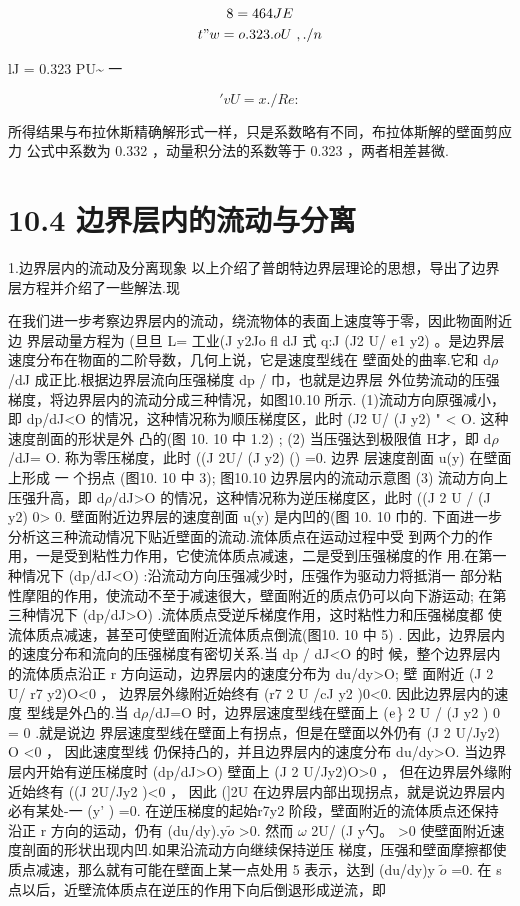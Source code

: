 \begin{gather*}
8=464JE\\
t"w = o. 323.oU ~,  ./n
\end{gather*}

lJ = 0.323 PU\textasciitilde{} 一

\['v U = x ./Re:\]

所得结果与布拉休斯精确解形式一样，只是系数略有不同，布拉体斯解的壁面剪应力 公式中系数为 0.332 ，动量积分法的系数等于 0.323 ，两者相差甚微.

\section*{10.4  边界层内的流动与分离}

1.边界层内的流动及分离现象 以上介绍了普朗特边界层理论的思想，导出了边界层方程并介绍了一些解法.现

在我们进一步考察边界层内的流动，绕流物体的表面上速度等于零，因此物面附近边 界层动量方程为 (旦旦 L= 工业(J y2Jo fl dJ 式 q:J (J2 U/ ${\rm e}$1 y2) 。是边界层速度分布在物面的二阶导数，几何上说，它是速度型线在 壁面处的曲率.它和 d$\rho$/dJ 成正比.根据边界层流向压强梯度 dp / 巾，也就是边界层 外位势流动的压强梯度，将边界层内的流动分成三种情况，如图10.10 所示. (1)流动方向原强减小，即 dp/dJ<O 的情况，这种情况称为顺压梯度区，此时 (J2 U/ (J y2) " < O. 这种速度剖面的形状是外 凸的(图 10. 10 中 1.2) ; (2) 当压强达到极限值 H才，即 d$\rho$/dJ= O. 称为零压梯度，此时 ((J 2U/ (J y2) () =0. 边界 层速度剖面 u(y) 在壁面上形成 一 个拐点 (图10. 10 中 3); 图10.10 边界层内的流动示意图 (3) 流动方向上压强升高，即 d$\rho$/dJ>O 的情况，这种情况称为逆压梯度区，此时 ((J 2 U / (J y2) 0> 0. 壁面附近边界层的速度剖面 u(y) 是内凹的(图 10. 10 巾的. 下面进一步分析这三种流动情况下贴近壁面的流动.流体质点在运动过程中受 到两个力的作用，一是受到粘性力作用，它使流体质点减速，二是受到压强梯度的作 用.在第一种情况下 (dp/dJ<O) :沿流动方向压强减少时，压强作为驱动力将抵消一 部分粘性摩阻的作用，使流动不至于减速很大，壁面附近的质点仍可以向下游运动; 在第三种情况下 (dp/dJ>O) .流体质点受逆斥梯度作用，这时粘性力和压强梯度都 使流体质点减速，甚至可使壁面附近流体质点倒流(图10. 10 中 5) . 因此，边界层内的速度分布和流向的压强梯度有密切关系.当 dp / dJ<O 的时 候，整个边界层内的流体质点沿正 r 方向运动，边界层内的速度分布为 du/dy>O; 壁 面附近 (J 2 U/ r7 y2)O<0 ， 边界层外缘附近始终有 (r7 2 U /cJ y2 )0<0. 因此边界层内的速度 型线是外凸的.当 d$\rho$/dJ=O 时，边界层速度型线在壁面上 (${\rm e}$\} 2 U / (J y2 ) 0 = 0 .就是说边 界层速度型线在壁面上有拐点，但是在壁面以外仍有 (J 2 U/Jy2) O <0 ， 因此速度型线 仍保持凸的，并且边界层内的速度分布 du/dy>O. 当边界层内开始有逆压梯度时 (dp/dJ>O) 壁面上 (J 2 U/Jy2)O>0 ， 但在边界层外缘附近始终有 ((J 2U/Jy2 )<0 ， 因此 (]2U 在边界层内部出现拐点，就是说边界层内必有某处-一 (y' ) =0. 在逆压梯度的起始r7y2 阶段，壁面附近的流体质点还保持沿正 r 方向的运动，仍有 (du/dy).y$\tilde{o}$ >0. 然而 $\omega$ 2U/ (J y勺。 >0 使壁面附近速度剖面的形状出现内凹.如果沿流动方向继续保持逆压 梯度，压强和壁面摩擦都使质点减速，那么就有可能在壁面上某一点处用 5 表示，达到 (du/dy)y $\tilde{o}$ =0. 在 s 点以后，近壁流体质点在逆压的作用下向后倒退形成逆流，即

